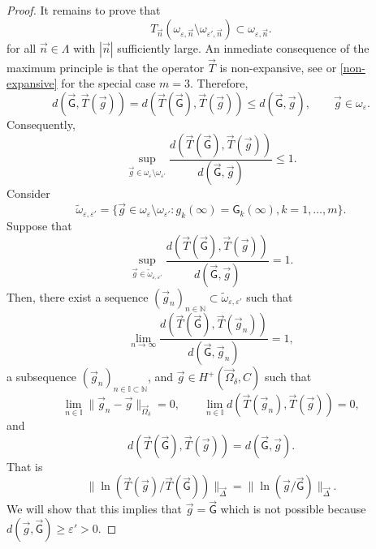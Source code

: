 \documentclass{amsart}
\numberwithin{equation}{section}
\theoremstyle{definition}
\newcommand{\n}{\vec{n}}          %
\begin{document}
\begin{proof}
 It remains to prove that
 \begin{equation}
 	\label{include2}
 	T_{\n}(\omega_{\varepsilon, \n} \setminus   \omega_{\varepsilon', \n}) \subset \omega_{\varepsilon, \n}.
 \end{equation}
 for all $\n \in \Lambda$ with $|\n|$ sufficiently large. An inmediate consequence of the maximum principle is that
 the operator $\vec{T}$ is non-expansive, see \cite[Proposition 1.1]{sasha99} or \eqref{non-expansive} for the special  case $m=3$. Therefore,
 \[
 d( \vec{\mathsf{G}}, \vec{T}(\vec{g})) = d(\vec{T}(\vec{\mathsf{G}}), \vec{T}(\vec{g}))  \leq d(\vec{\mathsf{G}},  \vec{g}), \qquad \vec{ g} \in \omega_{\varepsilon}.
 \]
 Consequently,
 \[
 \sup_{\vec{g} \in \omega_{\varepsilon} \setminus   \omega_{\varepsilon'}}
 \frac{d(\vec{T}(\vec{\mathsf{G}}), \vec{T}(\vec{g}))}{d(\vec{\mathsf{G}},  \vec{g})} \leq 1.
 \]
 Consider
 \[ \tilde{\omega}_{\varepsilon,\varepsilon'} = \{\vec{g} \in  \omega_{\varepsilon}\setminus \omega_{\varepsilon'}: g_k(\infty) = \mathsf{G}_k(\infty), k=1,\ldots,m\}.
 \]
 Suppose that
 \[ \sup_{\vec{g} \in  \tilde{\omega}_{\varepsilon,\varepsilon'}}
 \frac{d(\vec{T}(\vec{\mathsf{G}}), \vec{T}(\vec{g}))}{d(\vec{\mathsf{G}},  \vec{g})} = 1.
 \]
  Then, there exist a sequence
  $(\vec{g}_n)_{n \in \mathbb{N}} \subset  \tilde{\omega}_{\varepsilon,\varepsilon'}$ such that
 \[
 \lim_{n \to \infty} \frac{d(\vec{T}(\vec{\mathsf{G}}), \vec{T}(\vec{g}_n))}{d(\vec{\mathsf{G}},  \vec{g}_n )} = 1,
 \]
 a subsequence $(\vec{g}_n )_{n \in \mathbb{I} \subset \mathbb{N}} $, and
  $\vec{g} \in H^{+}(\vec{\Omega}_\delta,C)$ such that
 \[
  \lim_{n \in \mathbb{I}} \|\vec{g}_n  - \vec{g}\|_{\vec{\Omega}_{\delta}} = 0,
  \qquad \lim_{n \in \mathbb{I}} d(\vec{T}(\vec{g}_n  ), \vec{T}( \vec{g})) = 0,
 \]
 and
 \[
 {d(\vec{T}(\vec{\mathsf{G}}), \vec{T}(\vec{g}))} = {d(\vec{\mathsf{G}},  \vec{g} )}.
 \]
 That is
 \begin{equation}
 	\label{igualnormas}
 	\|\ln(\vec{T}(\vec{g})/\vec{T}(\vec{\mathsf{G}}))\|_{\vec{\Delta}} =  \|\ln(\vec{g}/\vec{\mathsf{G}})\|_{\vec{\Delta}}.
 \end{equation}
 We will show that this implies that $\vec{g} = \vec{\mathsf{G}}$ which is not possible because
 $d(\vec{g},\vec{\mathsf{G}}) \geq \varepsilon' >0$.


\end{proof}
\end{document}
